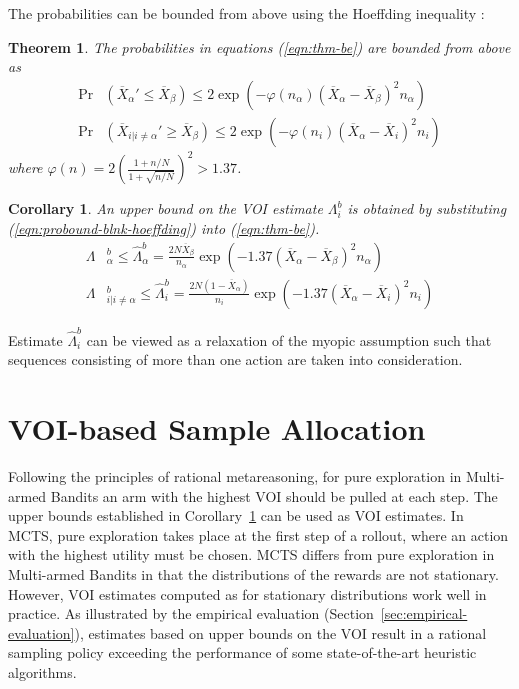 \documentclass{ecai2012}
\newtheorem{thm}{Theorem}
\newtheorem{crl}{Corollary}
\begin{document}
The probabilities can be bounded from above using the
Hoeffding inequality \cite{Hoeffding.ineq}:
\begin{thm} The probabilities in equations (\ref{eqn:thm-be}) are bounded from above as
\begin{align}
\Pr&(\overline X_\alpha' \le \overline X_\beta)
  \le 2\exp\left(- \varphi(n_\alpha)(\overline X_\alpha - \overline X_\beta)^2 n_\alpha
   \right)\nonumber\\
\Pr&(\overline X_{i|i\ne\alpha}' \ge \overline X_\beta)
   \le 2\exp\left(- \varphi(n_i) (\overline X_\alpha -\overline  X_i)^2 n_i \right)
\label{eqn:probound-blnk-hoeffding}
\end{align}
where $\varphi(n)=2(\frac {1+n/N} {1+\sqrt {n/N}})^2 > 1.37$.
\label{thm:hoeffding-prob-bounds}
\end{thm}
\begin{crl}
An upper bound on the VOI estimate $\Lambda_i^b$ is obtained
by substituting (\ref{eqn:probound-blnk-hoeffding}) into (\ref{eqn:thm-be}).
\begin{align}
  \Lambda&_\alpha^b \le \hat\Lambda_\alpha^b=\frac {2N\overline X_\beta} {n_\alpha}\exp\left(- 1.37(\overline X_\alpha - \overline X_\beta)^2 n_\alpha\right)\nonumber\\
  \Lambda&_{i|i\ne\alpha}^b\le \hat\Lambda_i^b=  \frac {2N(1-\overline  X_\alpha)} {n_i}\exp\left(- 1.37(\overline X_\alpha - \overline X_i)^2 n_i\right)
\label{eqn:bound-blnk-hoeffding}
\end{align}
\label{crl:bound-blnk-hoeffding}
\end{crl}
Estimate $\hat\Lambda_i^b$ can be viewed as a
relaxation of the myopic assumption such that sequences consisting
of more than one action are taken into consideration.

\section{VOI-based Sample Allocation}

Following the principles of rational metareasoning, for pure
exploration in Multi-armed Bandits an arm with
the highest VOI should be pulled at each step. The upper bounds
established in Corollary~\ref{crl:bound-blnk-hoeffding} can be used
as VOI estimates. In MCTS, pure exploration takes place at the first
step of a rollout, where an action with the highest utility must
be chosen. MCTS differs from pure exploration in Multi-armed Bandits
in that the distributions of the rewards are not stationary. However,
VOI estimates computed as for stationary distributions work well in
practice. As illustrated by the empirical evaluation
(Section~\ref{sec:empirical-evaluation}), estimates based on upper
bounds on the VOI result in a rational sampling policy exceeding the
performance of some state-of-the-art heuristic algorithms.
\end{document}
